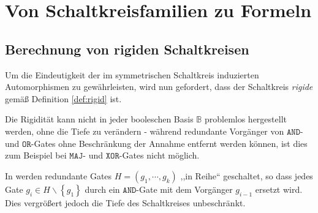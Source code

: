 
\chapter{Von Schaltkreisfamilien zu Formeln}

\section{Berechnung von rigiden Schaltkreisen}

Um die Eindeutigkeit der im symmetrischen Schaltkreis induzierten
Automorphismen zu gewährleisten, wird nun gefordert, dass der Schaltkreis
\emph{rigide }gemäß Definition \ref{def:rigid} ist.

Die Rigidität kann nicht in jeder booleschen Basis $\mathbb{B}$ problemlos
hergestellt werden, ohne die Tiefe zu verändern - während redundante
Vorgänger von $\mathtt{AND}$- und $\mathtt{OR}$-Gates ohne Beschränkung
der Annahme entfernt werden können, ist dies zum Beispiel bei $\mathtt{MAJ}$-
und $\mathtt{XOR}$-Gates nicht möglich.

In \cite{AD2014} werden redundante Gates $H=\left(g_{1},\cdots,g_{k}\right)$
,,in Reihe`` geschaltet, so dass jedes Gate $g_{i}\in H\backslash\left\{ g_{1}\right\} $
durch ein $\mathtt{AND}$-Gate mit dem Vorgänger $g_{i-1}$ ersetzt
wird. Dies vergrößert jedoch die Tiefe des Schaltkreises unbeschränkt.

